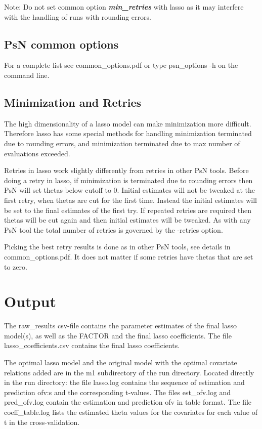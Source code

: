 Note: Do not set common option \emph{\textbf{min\_retries}} with lasso as it may interfere with the handling of runs with rounding errors.
\subsection{PsN common options}
For a complete list see common\_options.pdf or type psn\_options -h on the command line.

\subsection{Minimization and Retries}
The high dimensionality of a lasso model can make minimization more difficult. Therefore lasso has some special methods for handling minimization terminated due to rounding errors, and minimization terminated due to max number of evaluations exceeded.

Retries in lasso work slightly differently from retries in other PsN tools. Before doing a retry in lasso, if minimization is terminated due to rounding errors then PsN will set thetas below cutoff to 0. Initial estimates will not be tweaked at the first retry, when thetas are cut for the first time. Instead the initial estimates will be set to the final estimates of the first try. If repeated retries are required then thetas will be cut again and then initial estimates will be tweaked. As with any PsN tool the total number of retries is governed by the -retries option. 

Picking the best retry results is done as in other PsN tools, see details in common\_options.pdf. It does not matter if some retries have thetas that are set to zero.

\section{Output}
The raw\_results csv-file contains the parameter estimates of the final lasso model(s), as well as the FACTOR and
the final lasso coefficients. The file lasso\_coefficients.csv contains the final lasso coefficients.

The optimal lasso model and the original model with the optimal covariate relations added are in the m1 subdirectory of the run directory. Located directly in the run directory: the file lasso.log contains the sequence of estimation and prediction ofv:s and the corresponding t-values. The files est\_ofv.log and pred\_ofv.log contain the estimation and prediction ofv in table format. The file coeff\_table.log lists the estimated theta values for the covariates for each value of t in the cross-validation.

